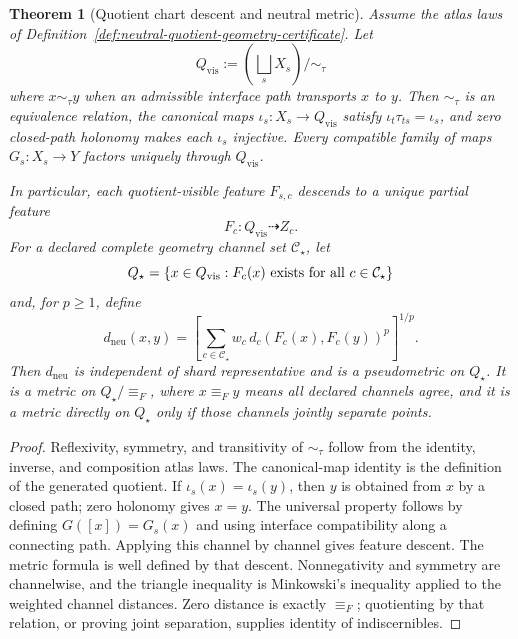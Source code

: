 \documentclass[11pt]{article}
\newtheorem{theorem}{Theorem}[section]
\begin{document}
\begin{theorem}[Quotient chart descent and neutral metric]\label{thm:neutral-quotient-metric}
Assume the atlas laws of Definition~\ref{def:neutral-quotient-geometry-certificate}. Let
\[
Q_{\mathrm{vis}}
:=
\left(\bigsqcup_s X_s\right)\big/\sim_\tau
\]
where \(x\sim_\tau y\) when an admissible interface path transports \(x\) to \(y\). Then
\(\sim_\tau\) is an equivalence relation, the canonical maps
\(\iota_s:X_s\to Q_{\mathrm{vis}}\) satisfy
\(\iota_t\tau_{ts}=\iota_s\), and zero closed-path holonomy makes each \(\iota_s\) injective.
Every compatible family of maps \(G_s:X_s\to Y\) factors uniquely through
\(Q_{\mathrm{vis}}\).

In particular, each quotient-visible feature \(F_{s,c}\) descends to a unique partial feature
\[
F_c:Q_{\mathrm{vis}}\dashrightarrow Z_c .
\]
For a declared complete geometry channel set \(\mathcal C_\star\), let
\[
Q_\star=\{x\in Q_{\mathrm{vis}}:F_c(x)\ \hbox{exists for all }c\in\mathcal C_\star\}
\]
and, for \(p\ge 1\), define
\[
d_{\mathrm{neu}}(x,y)
=
\left[
\sum_{c\in\mathcal C_\star}
w_c\,d_c(F_c(x),F_c(y))^p
\right]^{1/p}.
\]
Then \(d_{\mathrm{neu}}\) is independent of shard representative and is a pseudometric on
\(Q_\star\). It is a metric on \(Q_\star/\!\equiv_F\), where \(x\equiv_F y\) means all declared
channels agree, and it is a metric directly on \(Q_\star\) only if those channels jointly
separate points.
\end{theorem}

\begin{proof}
Reflexivity, symmetry, and transitivity of \(\sim_\tau\) follow from the identity, inverse, and
composition atlas laws. The canonical-map identity is the definition of the generated quotient.
If \(\iota_s(x)=\iota_s(y)\), then \(y\) is obtained from \(x\) by a closed path; zero holonomy
gives \(x=y\). The universal property follows by defining \(G([x])=G_s(x)\) and using interface
compatibility along a connecting path. Applying this channel by channel gives feature descent.
The metric formula is well defined by that descent. Nonnegativity and symmetry are channelwise,
and the triangle inequality is Minkowski's inequality applied to the weighted channel distances.
Zero distance is exactly \(\equiv_F\); quotienting by that relation, or proving joint separation,
supplies identity of indiscernibles.
\end{proof}
\end{document}
